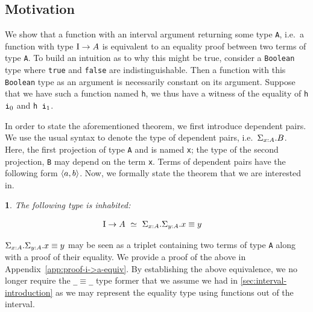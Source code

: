 \documentclass[12pt,twoside,maitrise]{dms}
\newtheorem{theo}[cor]{\theoremname}
\theoremstyle{definition}
\numberwithin{equation}{section}
\numberwithin{table}{chapter}
\numberwithin{figure}{chapter}
\newcommand\id[1] {\texttt{#1}}
\newcommand\fn[1] {\texttt{#1}}
\begin{document}
\subsection{Motivation}
We show that a function with an interval argument returning some type \id{A},
i.e.\ a function with type \fn{$\mathrm{I} \rightarrow A$} is equivalent to an equality
proof between two terms of type \id{A}. To build an intuition as to why this
might be true, consider a \id{Boolean} type where \id{true} and \id{false} are
indistinguishable. Then a function with this \id{Boolean} type as an argument is
necessarily constant on its argument. Suppose that we have such a function named
\id{h}, we thus have a witness of the equality of \fn{h $\ileft$} and \fn{h
  $\iright$}.

In order to state the aforementioned theorem, we first introduce dependent
pairs. We use the usual syntax to denote the type of dependent pairs,
i.e.\ $\Sigma_{\oftype{x}{A}}. B$. Here, the first projection of type \id{A} and
is named \id{x}; the type of the second projection, \id{B} may depend on the
term \id{x}. Terms of dependent pairs have the following form $\braket{a, b}$.
Now, we formally state the theorem that we are interested in.

\begin{theo}\label{theo:i->a-equiv}
The following type is inhabited:

\begin{align}
  & \bI \rightarrow A \ \simeq \ \Sigma_{\oftype{x}{A}} . \Sigma_{\oftype{y}{A}} . \eqtype{x}{y}\nonumber
\end{align}

\end{theo}

$\Sigma_{\oftype{x}{A}} . \Sigma_{\oftype{y}{A}} . \eqtype{x}{y}$ may be seen as
a triplet containing two terms of type \id{A} along with a proof of their
equality. We provide a proof of the above in
Appendix~\ref{app:proof-i->a-equiv}. By establishing the above equivalence, we
no longer require the \fn{_$\equiv$_} type former that we assume we had in
\autoref{sec:interval-introduction} as we may represent the equality type using
functions out of the interval.
\end{document}
